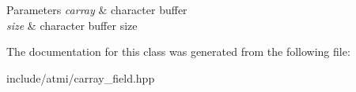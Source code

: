 \begin{DoxyParams}{Parameters}
{\em carray} & character buffer \\
\hline
{\em size} & character buffer size \\
\hline
\end{DoxyParams}


The documentation for this class was generated from the following file\+:\begin{DoxyCompactItemize}
\item 
include/atmi/carray\+\_\+field.\+hpp\end{DoxyCompactItemize}
